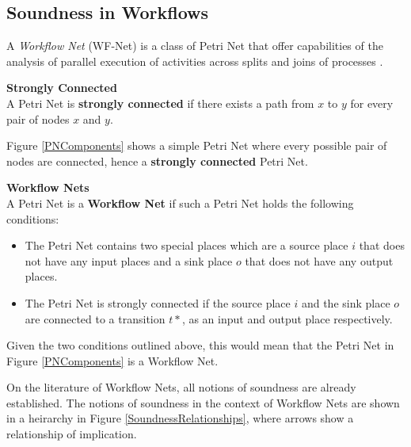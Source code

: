 \subsection*{Soundness in Workflows}
A \emph{Workflow Net} (WF-Net) is a class of Petri Net that offer capabilities of the analysis of parallel execution of activities across splits and joins of processes \cite{Malinao2017}. 
\begin{defn}\textbf{Strongly Connected} \cite{Malinao2017}\\
    \label{StrongConnDef}
    A Petri Net is \textbf{strongly connected} if there exists a path from $x$ to $y$ for every pair of nodes $x$ and $y$.
\end{defn}
Figure \ref{PNComponents} shows a simple Petri Net where every possible pair of nodes are connected, hence a \textbf{strongly connected} Petri Net. 

\begin{defn}\textbf{Workflow Nets} \cite{Malinao2017}\\
    \label{WNDef}
    A Petri Net is a \textbf{Workflow Net} if such a Petri Net holds the following conditions:
    \begin{itemize}
        \item The Petri Net contains two special places which are a source place $ i $ that does not have any input places and a sink place $ o $ that does not have any output places.
        \item The Petri Net is strongly connected if the source place $ i $ and the sink place $ o $ are connected to a transition $ t* $, as an input and output place respectively.
    \end{itemize}
\end{defn}
Given the two conditions outlined above, this would mean that the Petri Net in Figure \ref{PNComponents} is a Workflow Net.

On the literature of Workflow Nets, all notions of soundness are already established. The notions of soundness in the context of Workflow Nets are shown in a heirarchy in Figure \ref{SoundnessRelationships}, where arrows show a relationship of implication.

